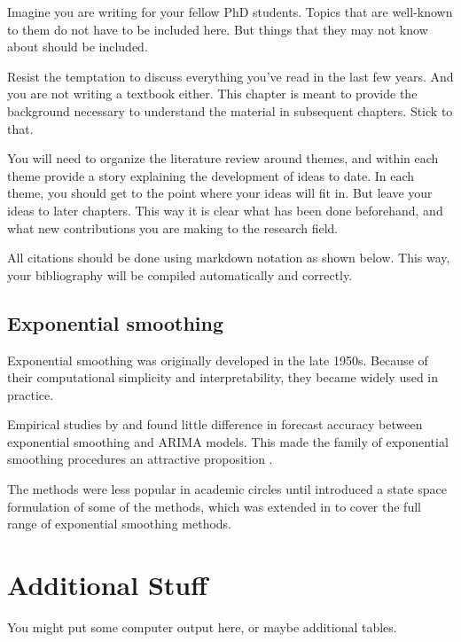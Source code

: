 \documentclass[oneside,12pt,a4paper,bibliography=totoc,numbers=noenddot,table]{scrreprt} %
\begin{document}
Imagine you are writing for your fellow PhD students. Topics that are well-known to them do not have to be included here. But things that they may not know about should be included.

Resist the temptation to discuss everything you've read in the last few years. And you are not writing a textbook either. This chapter is meant to provide the background necessary to understand the material in subsequent chapters. Stick to that.

You will need to organize the literature review around themes, and within each theme provide a story explaining the development of ideas to date. In each theme, you should get to the point where your ideas will fit in. But leave your ideas to later chapters. This way it is clear what has been done beforehand, and what new contributions you are making to the research field.

All citations should be done using markdown notation as shown below. This way, your bibliography will be compiled automatically and correctly.

\hypertarget{sec:expsmooth}{%
\section{Exponential smoothing}\label{sec:expsmooth}}

Exponential smoothing was originally developed in the late 1950s. Because of their computational simplicity and interpretability, they became widely used in practice.

Empirical studies by \textcite{MH79} and \textcite{Metal82} found little difference in forecast accuracy between exponential smoothing and ARIMA models. This made the family of exponential smoothing procedures an attractive proposition .

The methods were less popular in academic circles until \textcite{OKS97} introduced a state space formulation of some of the methods, which was extended in \textcite{HKSG02} to cover the full range of exponential smoothing methods.

\hypertarget{appendix-appendix}{%
\appendix}


\hypertarget{additional-stuff}{%
\chapter{Additional Stuff}\label{additional-stuff}}

You might put some computer output here, or maybe additional tables.
\end{document}
